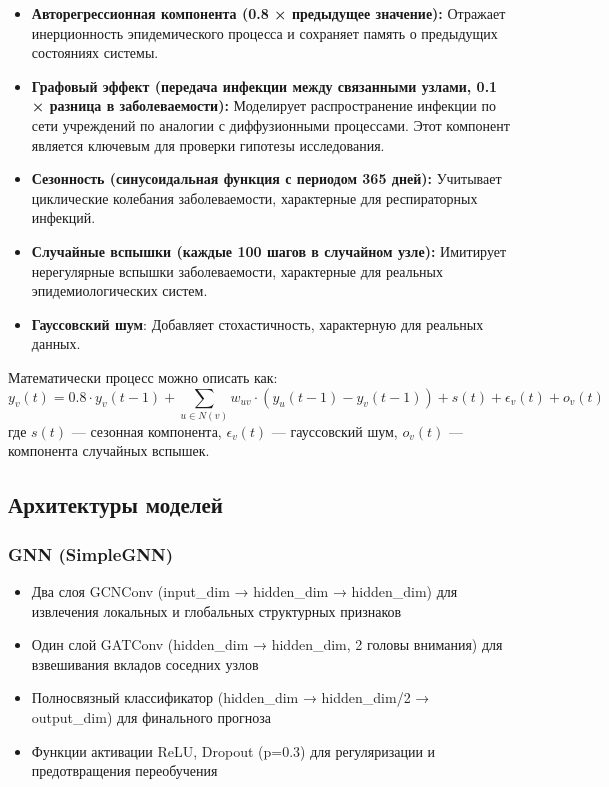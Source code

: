 \documentclass[12pt,a4paper]{article}
\begin{document}
	\begin{itemize}
		\item \textbf{Авторегрессионная компонента (0.8 × предыдущее значение):} Отражает инерционность эпидемического процесса и сохраняет память о предыдущих состояниях системы.
		\item \textbf{Графовый эффект (передача инфекции между связанными узлами, 0.1 × разница в заболеваемости):} Моделирует распространение инфекции по сети учреждений по аналогии с диффузионными процессами. Этот компонент является ключевым для проверки гипотезы исследования.
		\item \textbf{Сезонность (синусоидальная функция с периодом 365 дней):} Учитывает циклические колебания заболеваемости, характерные для респираторных инфекций.
		\item \textbf{Случайные вспышки (каждые 100 шагов в случайном узле):} Имитирует нерегулярные вспышки заболеваемости, характерные для реальных эпидемиологических систем.
		\item \textbf{Гауссовский шум}: Добавляет стохастичность, характерную для реальных данных.
	\end{itemize}
	
	Математически процесс можно описать как:
	$$ y_v(t) = 0.8 \cdot y_v(t-1) + \sum_{u \in N(v)} w_{uv} \cdot (y_u(t-1) - y_v(t-1)) + s(t) + \epsilon_v(t) + o_v(t) $$
	где $s(t)$ — сезонная компонента, $\epsilon_v(t)$ — гауссовский шум, $o_v(t)$ — компонента случайных вспышек.
	
	\subsection{Архитектуры моделей}
	\subsubsection*{GNN (SimpleGNN)}
	\begin{itemize}
		\item Два слоя GCNConv (input\_dim → hidden\_dim → hidden\_dim) для извлечения локальных и глобальных структурных признаков
		\item Один слой GATConv (hidden\_dim → hidden\_dim, 2 головы внимания) для взвешивания вкладов соседних узлов
		\item Полносвязный классификатор (hidden\_dim → hidden\_dim/2 → output\_dim) для финального прогноза
		\item Функции активации ReLU, Dropout (p=0.3) для регуляризации и предотвращения переобучения
	\end{itemize}
	
\end{document}
